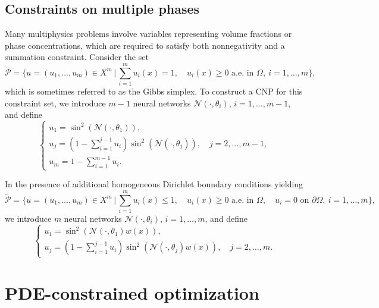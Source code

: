 \documentclass{article}
\numberwithin{equation}{section}
\begin{document}
\subsection{Constraints on multiple phases}

Many multiphysics problems involve variables representing volume fractions or phase concentrations, which are required to satisfy both nonnegativity and a summation constraint. Consider the set
\begin{equation}
    \mathcal{P}
    =
    \bigg\{
    u=(u_1,\dots,u_m)\in X^m
    \,\bigg|\,
    \sum_{i=1}^m u_i(x)=1,\quad
    u_i(x)\ge 0 \text{ a.e. in } \Omega,\ i=1,\dots,m
    \bigg\},
\end{equation}
which is sometimes referred to as the Gibbs simplex.
To construct a CNP for this constraint set, we introduce $m-1$ neural networks $\mathcal{N}(\cdot,\theta_i)$, $i=1,\dots,m-1$, and define
\begin{equation}
\begin{cases}
     u_1 = \sin^2(\mathcal{N}(\cdot,\theta_1)),\\[4pt]
     u_j = \left(1-\sum_{i=1}^{j-1}u_i\right)\sin^2(\mathcal{N}(\cdot,\theta_j)),
     \quad j=2,\dots,m-1,\\[4pt]
     u_m = 1-\sum_{i=1}^{m-1}u_i.
\end{cases}
\end{equation}

In the presence of additional homogeneous Dirichlet boundary conditions yielding
\begin{equation}
    \widetilde{\mathcal{P}}
    =
    \bigg\{
    u=(u_1,\dots,u_m)\in X^m
    \,\bigg|\,
    \sum_{i=1}^m u_i(x)\le 1,\quad
    u_i(x)\ge 0 \text{ a.e. in } \Omega,\quad
    u_i=0 \text{ on }\partial\Omega,\ i=1,\dots,m
    \bigg\},
\end{equation}
we introduce $m$ neural networks $\mathcal{N}(\cdot,\theta_i)$, $i=1,\dots,m$, and define
\begin{equation}
\begin{cases}
     u_1 = \sin^2(\mathcal{N}(\cdot,\theta_1)w(x)),\\[4pt]
     u_j = \left(1-\sum_{i=1}^{j-1}u_i\right)\sin^2(\mathcal{N}(\cdot,\theta_j)w(x)),
     \quad j=2,\dots,m.
\end{cases}
\end{equation}


\section{PDE-constrained optimization}
\label{sec:PDE}
\end{document}
